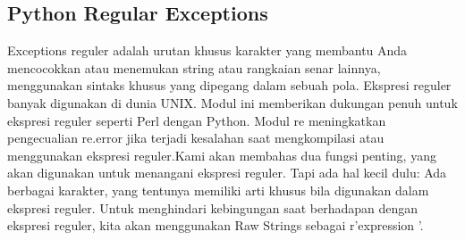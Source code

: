 \subsection {Python Regular Exceptions}
 Exceptions reguler adalah urutan khusus karakter yang membantu Anda mencocokkan atau menemukan string atau rangkaian senar lainnya, menggunakan sintaks khusus yang dipegang dalam sebuah pola. Ekspresi reguler banyak digunakan di dunia UNIX. Modul ini memberikan dukungan penuh untuk ekspresi reguler seperti Perl dengan Python. Modul re meningkatkan pengecualian re.error jika terjadi kesalahan saat mengkompilasi atau menggunakan ekspresi reguler.Kami akan membahas dua fungsi penting, yang akan digunakan untuk menangani ekspresi reguler. Tapi ada hal kecil dulu: Ada berbagai karakter, yang tentunya memiliki arti khusus bila digunakan dalam ekspresi reguler. Untuk menghindari kebingungan saat berhadapan dengan ekspresi reguler, kita akan menggunakan Raw Strings sebagai r'expression '.
